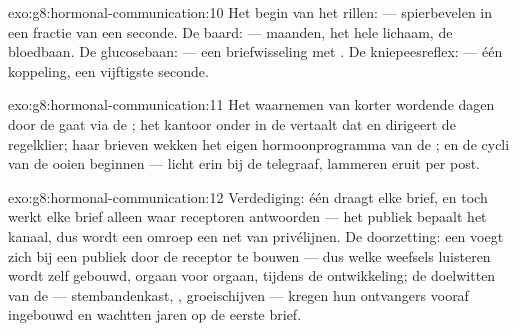 \begin{solution}{exo:g8:hormonal-communication:10}
Het begin van het rillen:  --- spierbevelen in een fractie van een
seconde. De baard:  --- maanden, het hele lichaam, de bloedbaan.
De glucosebaan:  --- een briefwisseling met . De
kniepeesreflex:  --- één koppeling, een vijftigste seconde.
\end{solution}

\begin{solution}{exo:g8:hormonal-communication:11}
Het waarnemen van korter wordende dagen door de  gaat via de ;
het kantoor onder in de  vertaalt dat en dirigeert de regelklier;
haar brieven wekken het eigen hormoonprogramma van de ; en de
cycli van de ooien beginnen --- licht erin bij de telegraaf, lammeren eruit
per post.
\end{solution}

\begin{solution}{exo:g8:hormonal-communication:12}
Verdediging: één  draagt elke brief, en toch werkt elke brief alleen
waar receptoren antwoorden --- het publiek bepaalt het kanaal, dus wordt
een omroep een net van privélijnen. De doorzetting: een  voegt zich bij
een publiek door de receptor te bouwen --- dus welke weefsels luisteren
wordt zelf gebouwd, orgaan voor orgaan, tijdens de ontwikkeling; de
doelwitten van de  --- stembandenkast, , groeischijven ---
kregen hun ontvangers vooraf ingebouwd en wachtten jaren op de eerste brief.
\end{solution}

